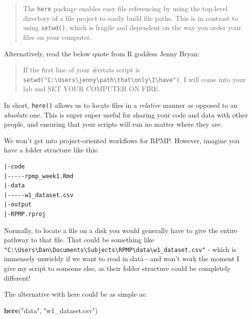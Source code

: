 \documentclass[
]{book}
\newenvironment{Shaded}{\begin{snugshade}}{\end{snugshade}}
\newcommand{\FunctionTok}[1]{\textcolor[rgb]{0.13,0.29,0.53}{\textbf{#1}}}
\newcommand{\NormalTok}[1]{#1}
\newcommand{\StringTok}[1]{\textcolor[rgb]{0.31,0.60,0.02}{#1}}
\begin{document}
\begin{quote}
The \texttt{here} package enables easy file referencing by using the top-level directory of a file project to easily build file paths. This is in contrast to using \texttt{setwd()}, which is fragile and dependent on the way you order your files on your computer.
\end{quote}

Alternatively, read the below quote from R goddess Jenny Bryan:

\begin{quote}
If the first line of your \#rstats script is \texttt{setwd("C:\textbackslash{}Users\textbackslash{}jenny\textbackslash{}path\textbackslash{}that\textbackslash{}only\textbackslash{}I\textbackslash{}have")}, I will come into your lab and SET YOUR COMPUTER ON FIRE.
\end{quote}

In short, \texttt{here()} allows us to locate files in a \emph{relative} manner as opposed to an \emph{absolute} one. This is super super useful for sharing your code and data with other people, and ensuring that your scripts will run no matter where they are.

We won't get into project-oriented workflows for RPMP. However, imagine you have a folder structure like this:

\begin{verbatim}
|-code
|-----rpmp_week1.Rmd
|-data
|-----w1_dataset.csv
|-output
|-RPMP.rproj
\end{verbatim}

Normally, to locate a file on a disk you would generally have to give the entire pathway to that file. That could be something like \texttt{"C:\textbackslash{}Users\textbackslash{}Dan\textbackslash{}Documents\textbackslash{}Subjects\textbackslash{}RPMP\textbackslash{}data\textbackslash{}w1\_dataset.csv"} - which is immensely unwieldy if we want to read in data - and won't work the moment I give my script to someone else, as their folder structure could be completely different!

The alternative with here could be as simple as:

\begin{Shaded}
\begin{Highlighting}[]
\FunctionTok{here}\NormalTok{(}\StringTok{"data"}\NormalTok{, }\StringTok{"w1\_dataset.csv"}\NormalTok{)}
\end{Highlighting}
\end{Shaded}
\end{document}
